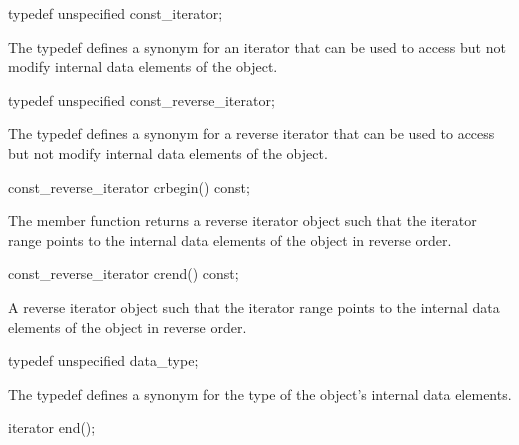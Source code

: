 \begin{addedblock}
\begin{itemdecl}
typedef unspecified const_iterator;
\end{itemdecl}

\begin{itemdescr}
The typedef defines a synonym for an iterator that can be used to access but not modify internal data elements of the  object.
\end{itemdescr}

\begin{itemdecl}
typedef unspecified const_reverse_iterator;
\end{itemdecl}

\begin{itemdescr}
The typedef defines a synonym for a reverse iterator that can be used to access but not modify internal data elements of the  object.
\end{itemdescr}

\begin{itemdecl}
const_reverse_iterator crbegin() const;
\end{itemdecl}

\begin{itemdescr}
\returns The member function returns a reverse iterator object such that the iterator range \tcode{[crbegin(), crend())} points to the internal data elements of the  object in reverse order.
\end{itemdescr}

\begin{itemdecl}
const_reverse_iterator crend() const;
\end{itemdecl}

\begin{itemdescr}
\returns A reverse iterator object such that the iterator range \tcode{[crbegin(), crend())} points to the internal data elements of the  object in reverse order.
\end{itemdescr}

\begin{itemdecl}
typedef unspecified data_type;
\end{itemdecl}

\begin{itemdescr}
The typedef defines a synonym for the type of the  object's internal data elements.
\end{itemdescr}

\begin{itemdecl}
iterator end();
\end{itemdecl}


\end{addedblock}
